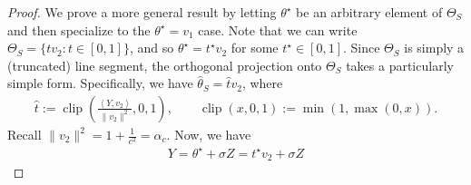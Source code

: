 \documentclass[11pt]{article}
\theoremstyle{plain}
\theoremstyle{definition}
\newcommand{\hatt}{\hat{t}}
\newcommand{\hattheta}{\hat{\theta}}
\newcommand{\inparen}[1]{\left(#1\right)}             %
\newcommand{\inp}[1]{\ensuremath{\left\langle #1 \right\rangle}}
\begin{document}
\begin{proof}
We prove a more general result by letting $\theta^\star$ be an arbitrary element of $\Theta_S$ and then specialize to the $\theta^\star = v_1$ case. Note that we can write $\Theta_S = \{ t v_2: t\in [0,1]\}$, and so $\theta^\star = t^\star v_2$ for some $t^\star \in [0,1]$. Since $\Theta_S$ is simply a (truncated) line segment, the orthogonal projection onto $\Theta_S$ takes a particularly simple form. Specifically, we have $\hattheta_S = \hatt v_2$, where 
\begin{align*}
    \hatt := \operatorname{clip} \inparen{\frac{\inp{Y, v_2}}{\|v_2\|^2},0,1},
    \qquad 
    \operatorname{clip}(x,0,1) := \min(1, \max(0,x)).
\end{align*}
Recall $\|v_2\|^2 = 1+\frac{1}{c^2}=\alpha_c$. Now, we have 
\begin{align*}
    Y = \theta^\star + \sigma Z = t^\star v_2 + \sigma Z
\end{align*}


\end{proof}
\end{document}
